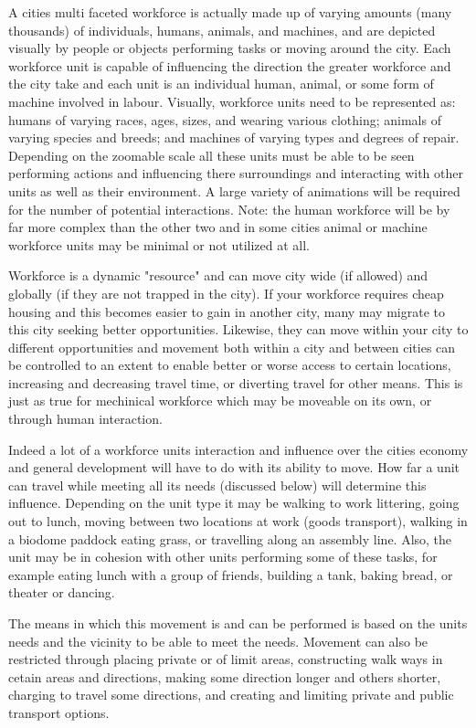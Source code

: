 A cities multi faceted workforce is actually made up of varying amounts (many thousands) of individuals, humans, animals, and machines, and are depicted visually by people or objects performing tasks or moving around the city. Each workforce unit is capable of influencing the direction the greater workforce and the city take and each unit is an individual human, animal, or some form of machine involved in labour. Visually, workforce units need to be represented as: humans of varying races, ages, sizes, and wearing various clothing; animals of varying species and breeds; and machines of varying types and degrees of repair. Depending on the zoomable scale all these units must be able to be seen performing actions and influencing there surroundings and interacting with other units as well as their environment. A large variety of animations will be required for the number of potential interactions. 
Note: the human workforce will be by far more complex than the other two and in some cities animal or machine workforce units may be minimal or not utilized at all.

Workforce is a dynamic "resource" and can move city wide (if allowed) and globally (if they are not trapped in the city). If your workforce requires cheap housing and this becomes easier to gain in another city, many may migrate to this city seeking better opportunities. Likewise, they can move within your city to different opportunities and movement both within a city and between cities can be controlled to an extent to enable better or worse access to certain locations, increasing and decreasing travel time, or diverting travel for other means. This is just as true for mechinical workforce which may be moveable on its own, or through human interaction. 

Indeed a lot of a workforce units interaction and influence over the cities economy and general development will have to do with its ability to move. How far a unit can travel while meeting all its needs (discussed below) will determine this influence. Depending on the unit type it may be walking to work littering, going out to lunch, moving between two locations at work (goods transport), walking in a biodome paddock eating grass, or travelling along an assembly line. Also, the unit may be in cohesion with other units performing some of these tasks, for example eating lunch with a group of friends, building a tank, baking bread, or theater or dancing. 

The means in which this movement is and can be performed is based on the units needs and the vicinity to be able to meet the needs. Movement can also be restricted through placing private or of limit areas, constructing walk ways in cetain areas and directions, making some direction longer and others shorter, charging to travel some directions, and creating and limiting private and public transport options. 


